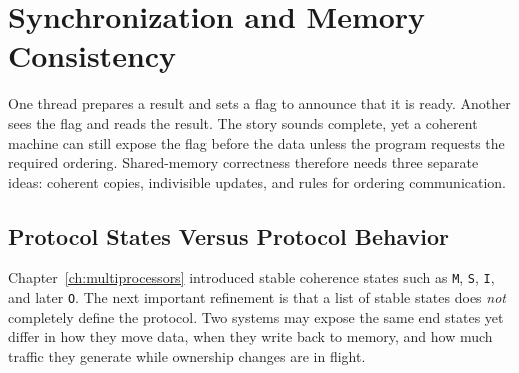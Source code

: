 \chapter[Synchronization and Memory Consistency]{Synchronization and Memory Consistency}\label{ch:sync-consistency}

One thread prepares a result and sets a flag to announce that it is ready.
Another sees the flag and reads the result.
The story sounds complete, yet a coherent machine can still expose the flag before the data unless the program requests the required ordering.
Shared-memory correctness therefore needs three separate ideas: coherent copies, indivisible updates, and rules for ordering communication.


\section{Protocol States Versus Protocol Behavior}\label{sec:sync-state-vs-protocol}
Chapter~\ref{ch:multiprocessors} introduced stable coherence states such as \texttt{M}, \texttt{S}, \texttt{I}, and later \texttt{O}.
The next important refinement is that a list of stable states does \emph{not} completely define the protocol.
Two systems may expose the same end states yet differ in how they move data, when they write back to memory, and how much traffic they generate while ownership changes are in flight.

